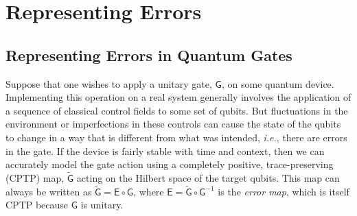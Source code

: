 \documentclass[aps,nofootinbib,pra,notitlepage,twocolumn]{revtex4-1}
\newcommand{\note}[1]{}
\begin{document}






\section{Representing Errors }
\label{sec:representing_quantum_gates}

\subsection{Representing Errors in Quantum Gates}
\noindent Suppose that one wishes to apply a unitary gate, $\mathsf{G}$, on some quantum device. Implementing this operation on a real system generally involves the application of a sequence of classical control fields to some set of qubits.  But fluctuations in the environment or imperfections in these controls can cause the state of the qubits to change in a way that is different from what was intended, \emph{i.e.}, there are errors in the gate. If the device is fairly stable with time and context\cite{Rudinger2019}, then we can accurately model the gate action using a completely positive, trace-preserving (CPTP) map, $\mathsf{\tilde G}$ acting on the Hilbert space of the target qubits. This map can always be written as $\mathsf{\tilde G} = \mathsf{E}\circ\mathsf{G}$, where $\mathsf{E} = \mathsf{\tilde G}\circ\mathsf{G}^{-1}$ is the \emph{error map}, which is itself CPTP because $\mathsf{G}$ is unitary.
\end{document}

